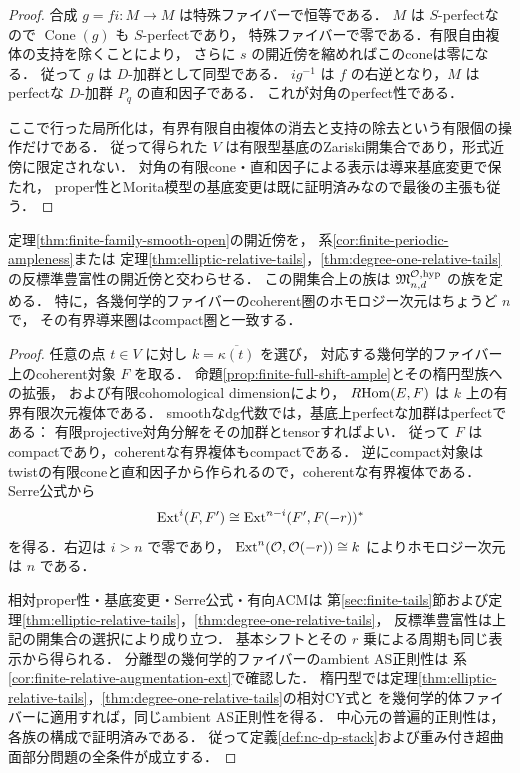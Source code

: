 \begin{proof}
合成 $g=fi:M\to M$ は特殊ファイバーで恒等である．
$M$ は $S$-perfectなので $\operatorname{Cone}(g)$ も $S$-perfectであり，
特殊ファイバーで零である．有限自由複体の支持を除くことにより，
さらに $s$ の開近傍を縮めればこのconeは零になる．
従って $g$ は $D$-加群として同型である．
$ig^{-1}$ は $f$ の右逆となり，$M$ はperfectな $D$-加群 $P_q$ の直和因子である．
これが対角のperfect性である．

ここで行った局所化は，有界有限自由複体の消去と支持の除去という有限個の操作だけである．
従って得られた $V$ は有限型基底のZariski開集合であり，形式近傍に限定されない．
対角の有限cone・直和因子による表示は導来基底変更で保たれ，
proper性とMorita模型の基底変更は既に証明済みなので最後の主張も従う．
\end{proof}

\begin{corollary}
\label{cor:finite-family-ncdp-open}
定理\ref{thm:finite-family-smooth-open}の開近傍を，
系\ref{cor:finite-periodic-ampleness}または
定理\ref{thm:elliptic-relative-tails}，\ref{thm:degree-one-relative-tails}の反標準豊富性の開近傍と交わらせる．
この開集合上の族は
$\mathfrak M^{\mathcal O,\mathrm{hyp}}_{n,d}$ の族を定める．
特に，各幾何学的ファイバーのcoherent圏のホモロジー次元はちょうど $n$ で，
その有界導来圏はcompact圏と一致する．
\end{corollary}
\begin{proof}
任意の点 $t\in V$ に対し $k=\overline{\kappa(t)}$ を選び，
対応する幾何学的ファイバー上のcoherent対象 $F$ を取る．
命題\ref{prop:finite-full-shift-ample}とその楕円型族への拡張，
および有限cohomological dimensionにより，
$R\!\operatorname{Hom}(E,F)$ は $k$ 上の有界有限次元複体である．
smoothなdg代数では，基底上perfectな加群はperfectである：
有限projective対角分解をその加群とtensorすればよい．
従って $F$ はcompactであり，coherentな有界複体もcompactである．
逆にcompact対象はtwistの有限coneと直和因子から作られるので，coherentな有界複体である．
Serre公式から
\[
 \operatorname{Ext}^i(F,F')\cong
       \operatorname{Ext}^{n-i}(F',F(-r))^*
\]
を得る．右辺は $i>n$ で零であり，
$\operatorname{Ext}^n(\mathcal O,\mathcal O(-r))\cong k$ によりホモロジー次元は $n$ である．

相対proper性・基底変更・Serre公式・有向ACMは
第\ref{sec:finite-tails}節および定理\ref{thm:elliptic-relative-tails}，\ref{thm:degree-one-relative-tails}，
反標準豊富性は上記の開集合の選択により成り立つ．
基本シフトとその $r$ 乗による周期も同じ表示から得られる．
分離型の幾何学的ファイバーのambient AS正則性は
系\ref{cor:finite-relative-augmentation-ext}で確認した．
楕円型では定理\ref{thm:elliptic-relative-tails}，\ref{thm:degree-one-relative-tails}の相対CY式と
\cite[Lemma 1.2]{RRZ2014}を幾何学的体ファイバーに適用すれば，同じambient AS正則性を得る．
中心元の普遍的正則性は，各族の構成で証明済みである．
従って定義\ref{def:nc-dp-stack}および重み付き超曲面部分問題の全条件が成立する．
\end{proof}

